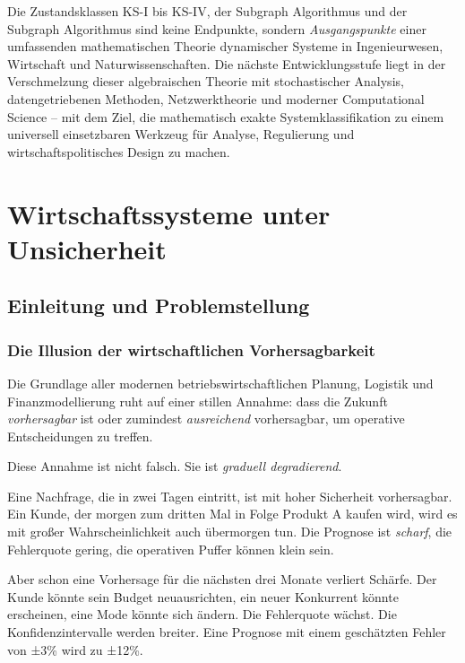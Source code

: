 \documentclass[a4paper, 12pt, twoside, openright]{report}
\theoremstyle{definition}
\theoremstyle{definition}
\begin{document}
Die Zustandsklassen KS-I bis KS-IV, der Subgraph Algorithmus und der Subgraph Algorithmus
sind keine Endpunkte, sondern \emph{Ausgangspunkte} einer umfassenden mathematischen
Theorie dynamischer Systeme in Ingenieurwesen, Wirtschaft und Naturwissenschaften.
Die nächste Entwicklungsstufe liegt in der Verschmelzung dieser algebraischen Theorie
mit stochastischer Analysis, datengetriebenen Methoden, Netzwerktheorie und moderner
Computational Science -- mit dem Ziel, die mathematisch exakte Systemklassifikation
zu einem universell einsetzbaren Werkzeug für Analyse, Regulierung und
wirtschaftspolitisches Design zu machen.

\cleardoublepage

\chapter{Wirtschaftssysteme unter Unsicherheit}
\label{ch:uncertainty-economics}

\section{Einleitung und Problemstellung}

\subsection{Die Illusion der wirtschaftlichen Vorhersagbarkeit}

Die Grundlage aller modernen betriebswirtschaftlichen Planung, Logistik und Finanzmodellierung ruht auf einer stillen Annahme: dass die Zukunft \emph{vorhersagbar} ist oder zumindest \emph{ausreichend} vorhersagbar, um operative Entscheidungen zu treffen.

Diese Annahme ist nicht falsch. Sie ist \emph{graduell degradierend}. 

Eine Nachfrage, die in zwei Tagen eintritt, ist mit hoher Sicherheit vorhersagbar. Ein Kunde, der morgen zum dritten Mal in Folge Produkt A kaufen wird, wird es mit großer Wahrscheinlichkeit auch übermorgen tun. Die Prognose ist \emph{scharf}, die Fehlerquote gering, die operativen Puffer können klein sein.

Aber schon eine Vorhersage für die nächsten drei Monate verliert Schärfe. Der Kunde könnte sein Budget neuausrichten, ein neuer Konkurrent könnte erscheinen, eine Mode könnte sich ändern. Die Fehlerquote wächst. Die Konfidenzintervalle werden breiter. Eine Prognose mit einem geschätzten Fehler von ±3\% wird zu ±12\%.
\end{document}
